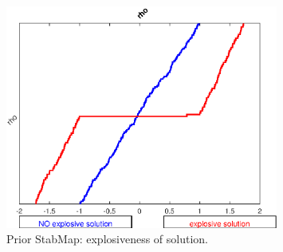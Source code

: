 
\begin{figure}[H]
\centering 
\includegraphics[width=0.8\textwidth]{RBC_kz/gsa/RBC_kz_prior_unstable}
\caption{Prior StabMap: explosiveness of solution.}\label{Fig:RBC_kz_prior_unstable}
\end{figure}

